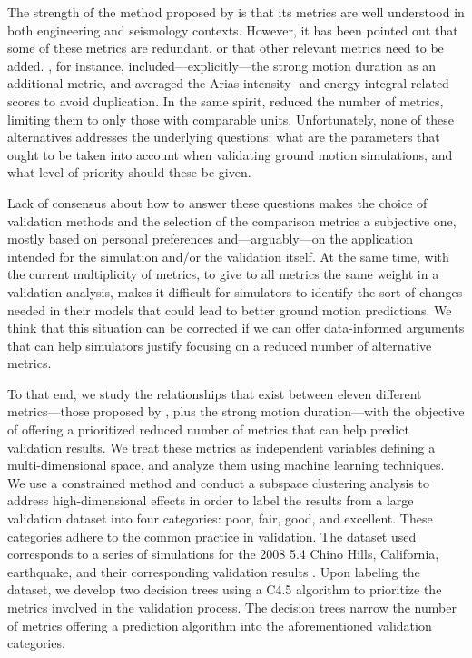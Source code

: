 The strength of the method proposed by \citet{Anderson_2004_Proc} is that its metrics are well understood in both engineering and seismology contexts. However, it has been pointed out that some of these metrics are redundant, or that other relevant metrics need to be added. \citet{Taborda_2013_BSSA}, for instance, included---explicitly---the strong motion duration \citep{Trifunac_1975_BSSA} as an additional metric, and averaged the Arias intensity- and energy integral-related scores to avoid duplication. In the same spirit, \citet{Maufroy_2015_BSSA} reduced the number of metrics, limiting them to only those with comparable units. Unfortunately, none of these alternatives addresses the underlying questions: what are the parameters that ought to be taken into account when validating ground motion simulations, and what level of priority should these be given.

Lack of consensus about how to answer these questions makes the choice of validation methods and the selection of the comparison metrics a subjective one, mostly based on personal preferences and---arguably---on the application intended for the simulation and/or the validation itself. At the same time, with the current multiplicity of metrics, to give to all metrics the same weight in a validation analysis, makes it difficult for simulators to identify the sort of changes needed in their models that could lead to better ground motion predictions. We think that this situation can be corrected if we can offer data-informed arguments that can help simulators justify focusing on a reduced number of alternative metrics.

To that end, we study the relationships that exist between eleven different metrics---those proposed by \citet{Anderson_2004_Proc}, plus the strong motion duration---with the objective of offering a prioritized reduced number of metrics that can help predict validation results. We treat these metrics as independent variables defining a multi-dimensional space, and analyze them using machine learning techniques. We use a constrained \kmeans{} method \citep[e.g.,][]{Macqueen_1967_Proc, Wagstaff_2001_Proc} and conduct a subspace clustering analysis to address high-dimensional effects in order to label the results from a large validation dataset into four categories: poor, fair, good, and excellent. These categories adhere to the common practice in validation. The dataset used corresponds to a series of simulations for the 2008  5.4 Chino Hills, California, earthquake, and their corresponding validation results \citep{Taborda_2014_BSSA}. Upon labeling the dataset, we develop two decision trees using a C4.5 algorithm \citep[][]{Quinlan_1993_Book} to prioritize the metrics involved in the validation process. The decision trees narrow the number of metrics offering a prediction algorithm into the aforementioned validation categories.

